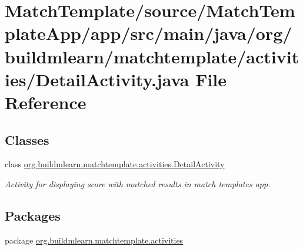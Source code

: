 \hypertarget{MatchTemplate_2source_2MatchTemplateApp_2app_2src_2main_2java_2org_2buildmlearn_2matchtemplate_2be61d8da09eb0481c1630e0dc8f4781a}{}\section{Match\+Template/source/\+Match\+Template\+App/app/src/main/java/org/buildmlearn/matchtemplate/activities/\+Detail\+Activity.java File Reference}
\label{MatchTemplate_2source_2MatchTemplateApp_2app_2src_2main_2java_2org_2buildmlearn_2matchtemplate_2be61d8da09eb0481c1630e0dc8f4781a}
\subsection*{Classes}
\begin{DoxyCompactItemize}
\item 
class \hyperlink{classorg_1_1buildmlearn_1_1matchtemplate_1_1activities_1_1DetailActivity}{org.\+buildmlearn.\+matchtemplate.\+activities.\+Detail\+Activity}
\begin{DoxyCompactList}\small\item\em Activity for displaying score with matched results in match template\textquotesingle{}s app. \end{DoxyCompactList}\end{DoxyCompactItemize}
\subsection*{Packages}
\begin{DoxyCompactItemize}
\item 
package \hyperlink{namespaceorg_1_1buildmlearn_1_1matchtemplate_1_1activities}{org.\+buildmlearn.\+matchtemplate.\+activities}
\end{DoxyCompactItemize}
